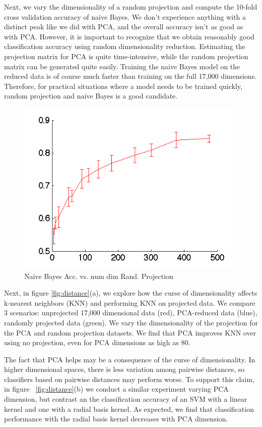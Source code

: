 Next, we vary the dimensionality of a random projection and compute the 10-fold cross validation accuracy of naive Bayes. We don't experience anything with a distinct peak like we did with PCA, and the overall accuracy isn't as good as with PCA. However, it is important to recognize that we obtain reasonably good classification accuracy using random dimensionality reduction. Estimating the projection matrix for PCA is quite time-intensive, while the random projection matrix can be generated quite easily. Training the naive Bayes model on the reduced data is of course much faster than training on the full 17,000 dimensions. Therefore, for practical situations where a model needs to be trained quickly, random projection and naive Bayes is a good candidate. 

\begin{center}
\begin{figure}[!ht]
\centering
\includegraphics[width=.5\textwidth]{../images/accuracy_vs_dim_randproj.png}
\caption{Naive Bayes Acc. vs. num dim Rand. Projection}
\label{fig:nb_rand_proj}
\end{figure}
\end{center}


	Next, in figure \ref{fig:distance}(a), we explore how the curse of dimensionality affects k-nearest neighbors (KNN) and performing KNN on projected data. We compare 3 scenarios: unprojected 17,000 dimensional data (red), PCA-reduced data (blue), randomly projected data (green). We vary the dimensionality of the projection for the PCA and random projection datasets. We find that  PCA improves KNN over using no projection, even for PCA dimensions as high as 80. 

	The fact that PCA helps may be a consequence of the curse of dimensionality. In higher dimensional spaces, there is less variation among pairwise distances, so classifiers based on pairwise distances may perform worse. To support this claim, in figure ~\ref{fig:distance}(b) we conduct a similar experiment varying PCA dimension, but contrast an the classification accuracy of an SVM with a linear kernel and one with a radial basis kernel. As expected, we find that classification performance with the radial basis kernel decreases with PCA dimension. 


